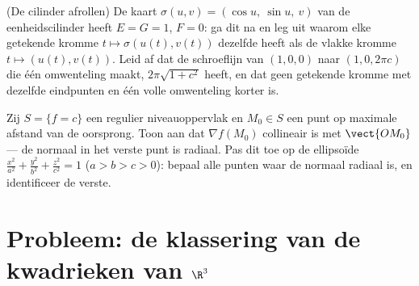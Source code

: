 \begin{exercise}[$\star\star$]\label{exo:b2:surfaces:11}
(De cilinder afrollen) De kaart $\sigma(u, v) = (\cos u,\ \sin u,\
v)$ van de eenheidscilinder heeft $E = G = 1$, $F = 0$: ga dit na
en leg uit waarom elke getekende kromme $t \mapsto \sigma(u(t),
v(t))$ dezelfde  heeft als de vlakke kromme $t \mapsto
(u(t), v(t))$. Leid af dat de schroeflijn van $(1, 0, 0)$ naar $(1,
0, 2\pi c)$ die één omwenteling maakt,  $2\pi\sqrt{1 + c^2}$
heeft, en dat geen getekende kromme met dezelfde eindpunten en één
volle omwenteling korter is.
\end{exercise}

\begin{exercise}[$\star\star\star$]\label{exo:b2:surfaces:12}
Zij $S = \{f = c\}$ een  regulier niveauoppervlak en $M_0
\in S$ een punt op maximale afstand van de oorsprong. Toon aan dat
$\nabla f(M_0)$ collineair is met $\vect{OM_0}$ --- de normaal in
het verste punt is radiaal. Pas dit toe op de ellipsoïde
$\frac{x^2}{a^2} + \frac{y^2}{b^2} + \frac{z^2}{c^2} = 1$ ($a > b >
c > 0$): bepaal alle punten waar de normaal radiaal is, en
identificeer de verste.
\end{exercise}

\section{Probleem: de klassering van de kwadrieken van $\R^3$}

